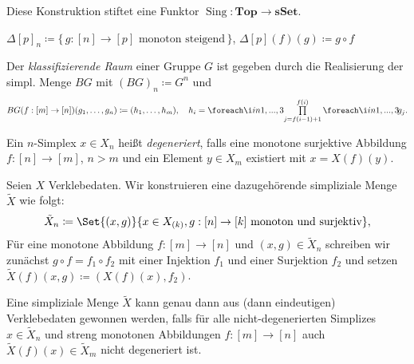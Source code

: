 \documentclass{cheat-sheet}
\newcommand{\nspace}[1]{\foreach \i in {1,...,#1}{ \! }} %
\newcommand{\sSet}{\mathbf{sSet}} %
\newcommand{\Top}{\mathbf{Top}} %
\DeclareMathOperator{\Sing}{Sing} %
\begin{document}
\begin{bem}
  Diese Konstruktion stiftet eine Funktor $\Sing : \Top \to \sSet$.
\end{bem}

\begin{defn}
  $\Delta[p]_n \coloneqq \{ \, g : [n] \to [p] \text{ monoton steigend} \, \}$, $\Delta[p](f)(g) \coloneqq g \circ f$
\end{defn}

\begin{defn}
  Der \emph{klassifizierende Raum} einer Gruppe $G$ ist gegeben durch die Realisierung der simpl. Menge $BG$ mit $(BG)_n \coloneqq G^n$ und
  \begin{align*}
    BG(f : [m] \to [n])(g_1, \ldots, g_n) \coloneqq
    (h_1, \ldots, h_m), \quad h_i = \nspace{3} \prod_{j=f(i-1)+1}^{f(i)} \nspace{3} g_j.
  \end{align*}
\end{defn}

\begin{defn}
  Ein $n$-Simplex $x \in X_n$ heißt \emph{degeneriert}, falls eine monotone surjektive Abbildung $f : [n] \to [m]$, $n > m$ und ein Element $y \in X_m$ existiert mit $x = X(f)(y)$.
\end{defn}

\begin{defn}
  Seien $X$ Verklebedaten. Wir konstruieren eine dazugehörende simpliziale Menge $\tilde{X}$ wie folgt:
  \[ \tilde{X}_n \coloneqq \Set{ (x, g) }{ x \in X_{(k)}, g : [n] \to [k] \text{ monoton und surjektiv} }, \]
  Für eine monotone Abbildung $f : [m] \to [n]$ und $(x, g) \in \tilde{X}_n$ schreiben wir zunächst $g \circ f = f_1 \circ f_2$ mit einer Injektion $f_1$ und einer Surjektion $f_2$ und setzen
  $\tilde{X}(f)(x, g) \coloneqq (X(f)(x), f_2)$.
\end{defn}

\begin{prop}
  Eine simpliziale Menge $\tilde{X}$ kann genau dann aus (dann eindeutigen) Verklebedaten gewonnen werden, falls für alle nicht-degenerierten Simplizes $x \in \tilde{X}_n$ und streng monotonen Abbildungen $f : [m] \to [n]$ auch $\tilde{X}(f)(x) \in \tilde{X}_m$ nicht degeneriert ist.
\end{prop}

\end{document}
